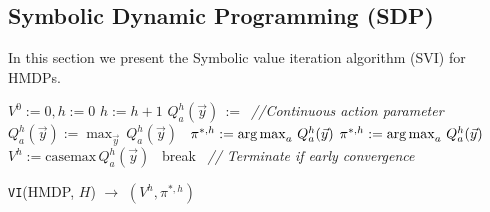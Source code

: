\documentclass[twoside,11pt]{article}
\def\argmax{\operatornamewithlimits{arg\max}}
\newcommand{\casemax}{\mathrm{casemax}}
\begin{document}
\subsection{Symbolic Dynamic Programming (SDP)}

In this section we present the Symbolic value iteration algorithm (SVI) for HMDPs.

\incmargin{.5em}
\linesnumbered
\begin{algorithm}[t!]
\vspace{-.5mm}
\dontprintsemicolon
{}
\Begin
{
   $V^0:=0, h:=0$\;
   {
       $h:=h+1$\;
       {
              $Q_a^{h}(\vec{y})\,:=\,$\;
			  \emph{//Continuous action parameter}\;
               {
               $Q_a^{h}(\vec{y}) := \max_{\vec{y}} \, Q_a^{h}(\vec{y})$ $\,$ \;
               $\pi^{*,h} := \argmax_{a} \, Q_a^{h}(\vec{y})$\;
               } 
               \Else 
               { $\pi^{*,h} := \argmax_{a} \, Q_a^{h}(\vec{y})$ \; }
        }
       $V^{h} := \casemax \, Q_a^{h}(\vec{y})$ $\,$ \;
           {break $\,$ \emph{// Terminate if early convergence}\;}
   }
      \;
}
\caption{\footnotesize \texttt{VI}(HMDP, $H$) $\longrightarrow$ $(V^h,\pi^{*,h})$ \label{alg:vi}}
\vspace{-1mm}
\end{algorithm}
\decmargin{.5em}
\end{document}
